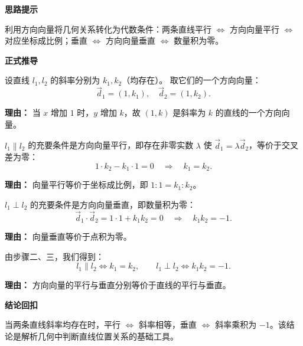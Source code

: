 \begin{proofbox}
	\textbf{\textcolor{CProof}{思路提示}}

	利用方向向量将几何关系转化为代数条件：两条直线平行 $\Longleftrightarrow$ 方向向量平行 $\Longleftrightarrow$ 对应坐标成比例；垂直 $\Longleftrightarrow$ 方向向量垂直 $\Longleftrightarrow$ 数量积为零。

	\medskip
	\textbf{\textcolor{CProof}{正式推导}}
	\begin{description}[style=nextline, leftmargin=2.8em, labelsep=0.5em, itemsep=0.55em]
		\item[\textbf{步骤一（设定方向向量）：}]
			设直线 $l_1,l_2$ 的斜率分别为 $k_1,k_2$（均存在）。
			取它们的一个方向向量：
			\[
				\vec{d}_1 = (1,k_1),\quad \vec{d}_2 = (1,k_2).
			\]
			\par\textbf{理由：} 当 $x$ 增加 $1$ 时，$y$ 增加 $k$，故 $(1,k)$ 是斜率为 $k$ 的直线的一个方向向量。

		\item[\textbf{步骤二（平行条件推证）：}]
			$l_1 \parallel l_2$ 的充要条件是方向向量平行，即存在非零实数 $\lambda$ 使 $\vec{d}_1 = \lambda\vec{d}_2$，等价于交叉差为零：
			\[
				1\cdot k_2 - k_1\cdot 1 = 0 \quad\Longrightarrow\quad k_1 = k_2.
			\]
			\par\textbf{理由：} 向量平行等价于坐标成比例，即 $1:1 = k_1:k_2$。

		\item[\textbf{步骤三（垂直条件推证）：}]
			$l_1 \perp l_2$ 的充要条件是方向向量垂直，即数量积为零：
			\[
				\vec{d}_1\cdot\vec{d}_2 = 1\cdot1 + k_1k_2 = 0 \quad\Longrightarrow\quad k_1k_2 = -1.
			\]
			\par\textbf{理由：} 向量垂直等价于点积为零。

		\item[\textbf{步骤四（结论回扣）：}]
			由步骤二、三，我们得到：
			\[
				l_1 \parallel l_2 \Longleftrightarrow k_1 = k_2,
				\qquad
				l_1 \perp l_2 \Longleftrightarrow k_1k_2 = -1.
			\]
			\par\textbf{理由：} 方向向量的平行与垂直分别等价于直线的平行与垂直。
	\end{description}

	\medskip
	\textbf{\textcolor{CProof}{结论回扣}}

	当两条直线斜率均存在时，平行 $\Longleftrightarrow$ 斜率相等，垂直 $\Longleftrightarrow$ 斜率乘积为 $-1$。该结论是解析几何中判断直线位置关系的基础工具。
\end{proofbox}
